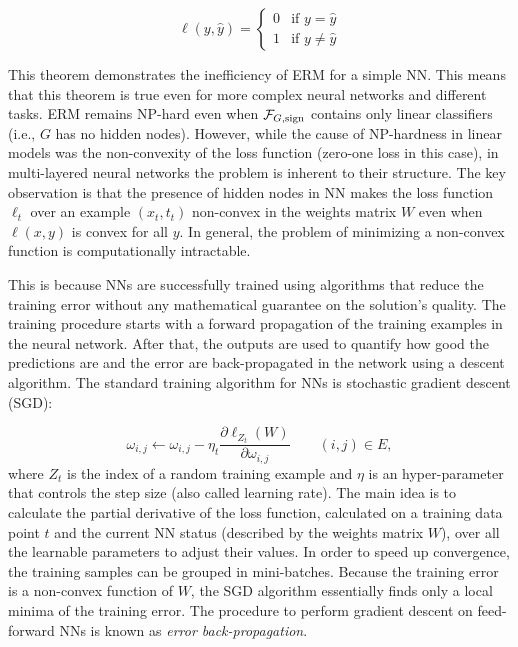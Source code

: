 \begin{equation}
	\label{formula:zero-oneloss}
	\ell(y, \hat y) = 
	\begin{cases}
	0 & \text{if $y = \hat y$} \\
	1 & \text{if $y \neq \hat y$}
	\end{cases}
\end{equation}

This theorem demonstrates the inefficiency of ERM for a simple NN. This means that this theorem is true even for more complex neural networks and different tasks. ERM remains NP-hard even when $\mathcal{F}_{G,\operatorname{sign}}$ contains only linear classifiers (i.e., $G$ has no hidden nodes). However, while the cause of NP-hardness in linear models was the non-convexity of the loss function (zero-one loss in this case), in multi-layered neural networks the problem is inherent to their structure. The key observation is that the presence of hidden nodes in NN makes the loss function $\ell_t$ over an example $(x_t, t_t)$ non-convex in the weights matrix $W$ even when $\ell(x, y)$ is convex for all $y$. In general, the problem of minimizing a non-convex function is computationally intractable.  

This is because NNs are successfully trained using algorithms that reduce the training error without any mathematical guarantee on the solution's quality. The training procedure starts with a forward propagation of the training examples in the neural network. After that, the outputs are used to quantify how good the predictions are and the error are back-propagated in the network using a descent algorithm. The standard training algorithm for NNs is stochastic gradient descent (SGD):

\begin{equation}
\omega_{i, j} \leftarrow \omega_{i, j} - \eta_t \frac{\partial\ell_{Z_t}(W)}{\partial\omega_{i, j}} \quad \quad (i, j) \in E,
\end{equation}
where $Z_t$ is the index of a random training example and $\eta$ is an hyper-parameter that controls the step size (also called learning rate). The main idea is to calculate the partial derivative of the loss function, calculated on a training data point $t$ and the current NN status (described by the weights matrix $W$), over all the learnable parameters to adjust their values. In order to speed up convergence, the training samples can be grouped in mini-batches. Because the training error is a non-convex function of $W$, the SGD algorithm essentially finds only a local minima of the training error. The procedure to perform gradient descent on feed-forward NNs is known as \textit{error back-propagation}. 

